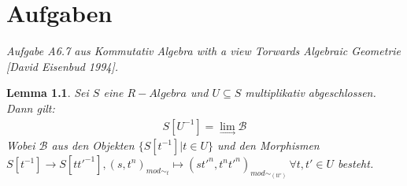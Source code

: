 \documentclass[10pt,a4paper]{report}
\newcommand{\comment}[1]{}
\newcommand{\ModulsOfDifferenzials}{Kommutativ Algebra with a view Torwards Algebraic Geometrie [David Eisenbud 1994]}
\newcounter{Aussage}[chapter]
\newtheorem{lemma}[Aussage]{Lemma}
\newcommand{\lok}[2]{#1 [#2^{-1}]}
\newcommand{\loke}[3]{(#1,#2)_{mod\sim_{#3}}}
\newcommand{\colimes}[0]{\lim\limits_{ \longrightarrow }}
\begin{document}
\chapter{Aufgaben}
\textit{Aufgabe A6.7 aus \ModulsOfDifferenzials.}
\begin{lemma}\comment{\label{Lokalisierung als Kolimes}}
Sei $S$ eine $R-Algebra$ und $U \subseteq S$ multiplikativ abgeschlossen.
Dann gilt:
\begin{gather*}
 S[U^{-1}] = \colimes \mathcal{B}
\end{gather*}
Wobei $\mathcal{B}$ aus den Objekten $\lbrace \lok{S}{t} \vert t \in U \rbrace$ und den Morphismen\\
$\lok{S}{t} \longrightarrow \lok{S}{tt'}, \loke{s}{t^n}{t} \longmapsto \loke{st'^n}{t^nt'^n}{(tt')} \,
\forall t,t' \in U$ besteht.\\
\end{lemma}
\end{document}
